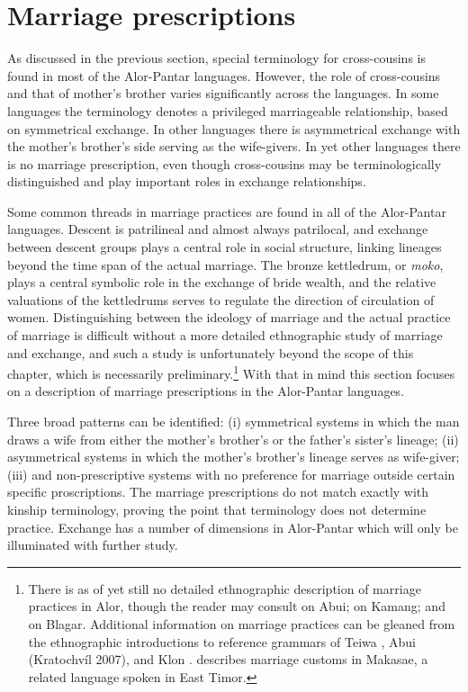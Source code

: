\section{Marriage prescriptions}
As discussed in the previous section, special terminology for cross-cousins is found in most of the Alor-Pantar languages. However, the role of cross-cousins and that of mother's brother varies significantly across the languages. In some languages the terminology denotes a privileged marriageable relationship, based on symmetrical exchange. In other languages there is asymmetrical exchange with the mother's brother's side serving as the wife-givers. In yet other languages there is no marriage prescription, even though cross-cousins may be terminologically distinguished and  play important roles in exchange relationships.

Some common threads in marriage practices are found in all of the Alor-Pantar languages. Descent is patrilineal and almost always patrilocal, and exchange between descent groups plays a central role in social structure, linking lineages beyond the time span of the actual marriage. The bronze kettledrum, or \textit{moko}, plays a central symbolic role in the exchange of bride wealth, and the relative valuations of the kettledrums serves to regulate the direction of circulation of women. Distinguishing between the ideology of marriage and the actual practice of marriage is difficult without a more detailed ethnographic study of marriage and exchange, and such a study is unfortunately beyond the scope of this chapter, which is necessarily preliminary.\footnote{{ }  There is as of yet still no detailed ethnographic description of marriage practices in Alor, though the reader may consult \citet{Nicolspeyer1940} on Abui; \citet{Stokhof1977} on Kamang; and \citet{Steinhauer2010} on Blagar. Additional information on marriage practices can be gleaned from the ethnographic introductions to reference grammars of Teiwa \citep{Klamer2010}, Abui (Kratochv\'il 2007), and Klon \citep{Baird2008}. \citet{Forman1980} describes marriage customs in Makasae, a related language spoken in East Timor.} With that in mind this section focuses on a description of marriage prescriptions in the Alor-Pantar languages.

Three broad patterns can be identified: (i) symmetrical systems in which the man draws a wife from either the mother's brother's or the father's sister's lineage; (ii) asymmetrical systems in which the mother's brother's lineage serves as wife-giver; (iii) and non-prescriptive systems with no preference for marriage outside certain specific proscriptions. The marriage prescriptions do not match exactly with kinship terminology, proving the point that  terminology does not determine practice. Exchange has a number of dimensions in Alor-Pantar which will only be illuminated with further study.

